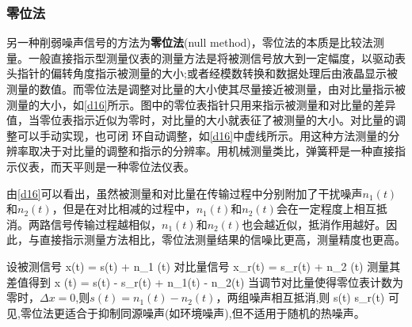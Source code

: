 \documentclass[11pt,a4paper]{ctexart}
\begin{document}
\subsubsection{零位法}
\par
另一种削弱噪声信号的方法为{\bf 零位法}(null method)，零位法的本质是比较法测量。一般直接指示型测量仪表的测量方法是将被测信号放大到一定幅度，以驱动表头指针的偏转角度指示被测量的大小;或者经模数转换和数据处理后由液晶显示被测量的数值。而零位法是调整对比量的大小使其尽量接近被测量，由对比量指示被测量的大小，如\cref{d16}所示。图中的零位表指针只用来指示被测量和对比量的差异值，当零位表指示近似为零时，对比量的大小就表征了被测量的大小。对比量的调整可以手动实现，也可闭 环自动调整，如\cref{d16}中虚线所示。用这种方法测量的分辨率取决于对比量的调整和指示的分辨率。用机械测量类比，弹簧秤是一种直接指示仪表，而天平则是一种零位法仪表。
\par
由\cref{d16}可以看出，虽然被测量和对比量在传输过程中分别附加了干扰噪声$n_1(t)$和$n_2(t)$，但是在对比相减的过程中，$n_1(t)$和$n_2(t)$会在一定程度上相互抵消。两路信号传输过程越相似，$n_1(t)$和$n_2(t)$也会越近似，抵消作用越好。因此，与直接指示测量方法相比，零位法测量结果的信噪比更高，测量精度也更高。
\par
设被测信号
\beq
x(t) = s(t) + n_1 (t)
\eeq
对比量信号
\beq
x_r(t) = s_r(t) + n_2 (t)
\eeq
测量其差值得到
\beq
\Delta x (t) = s(t) - s_r(t) + n_1(t) - n_2(t)
\eeq
当调节对比量使得零位表计数为零时，$\Delta x = 0$,则$s(t) = n_1(t)-n_2(t)$，两组噪声相互抵消,则
\beq
s(t) \simeq s_r(t)
\eeq
可见,零位法更适合于抑制同源噪声(如环境噪声),但不适用于随机的热噪声。
\end{document}
